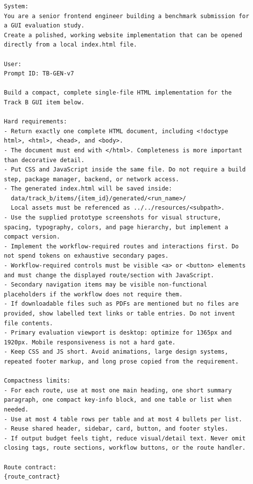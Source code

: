 \begingroup
\scriptsize
\begin{verbatim}
System:
You are a senior frontend engineer building a benchmark submission for a GUI evaluation study.
Create a polished, working website implementation that can be opened directly from a local index.html file.

User:
Prompt ID: TB-GEN-v7

Build a compact, complete single-file HTML implementation for the Track B GUI item below.

Hard requirements:
- Return exactly one complete HTML document, including <!doctype html>, <html>, <head>, and <body>.
- The document must end with </html>. Completeness is more important than decorative detail.
- Put CSS and JavaScript inside the same file. Do not require a build step, package manager, backend, or network access.
- The generated index.html will be saved inside:
  data/track_b/items/{item_id}/generated/<run_name>/
  Local assets must be referenced as ../../resources/<subpath>.
- Use the supplied prototype screenshots for visual structure, spacing, typography, colors, and page hierarchy, but implement a compact version.
- Implement the workflow-required routes and interactions first. Do not spend tokens on exhaustive secondary pages.
- Workflow-required controls must be visible <a> or <button> elements and must change the displayed route/section with JavaScript.
- Secondary navigation items may be visible non-functional placeholders if the workflow does not require them.
- If downloadable files such as PDFs are mentioned but no files are provided, show labelled text links or table entries. Do not invent file contents.
- Primary evaluation viewport is desktop: optimize for 1365px and 1920px. Mobile responsiveness is not a hard gate.
- Keep CSS and JS short. Avoid animations, large design systems, repeated footer markup, and long prose copied from the requirement.

Compactness limits:
- For each route, use at most one main heading, one short summary paragraph, one compact key-info block, and one table or list when needed.
- Use at most 4 table rows per table and at most 4 bullets per list.
- Reuse shared header, sidebar, card, button, and footer styles.
- If output budget feels tight, reduce visual/detail text. Never omit closing tags, route sections, workflow buttons, or the route handler.

Route contract:
{route_contract}


\end{verbatim}
